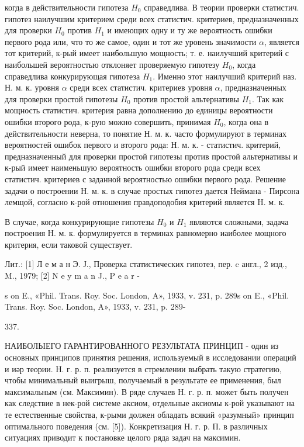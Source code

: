 \documentclass[10pt]{article}
\begin{document}
когда в действительности гипотеза $H_{0}$ справедлива. В теории проверки статистич. гипотез наилучшим критерием среди всех статистич. критериев, предназначенных для проверки $H_{0}$ против $H_{1}$ и имеющих одну и ту же вероятность ошибки первого рода или, что то же самое, один и тот же уровень значимости $\alpha$, является тот критерий, к-рый имеет наибольшую мощность; т. е. наилучший критерий с наибольшей вероятностью отклоняет проверяемую гипотезу $H_{0}$, когда справедлива конкурирующая гипотеза $H_{1}$. Именно этот наилучший критерий наз. Н. м. к. уровня $\alpha$ среди всех статистич. критериев уровня $\alpha$, предназначенных для проверки простой гипотезы $H_{0}$ против простой альтернативы $H_{1}$. Так как мощность статистич. критерия равна дополнению до единицы вероятности ошибки второго рода, к-рую можно совершить, принимая $H_{0}$, когда она в действительности неверна, то понятие Н. м. к. часто формулируют в терминах вероятностей ошибок первого и второго рода: Н. м. к. - статистич. критерий, предназначенный для проверки простой гипотезы против простой альтернативы и к-рый имеет наименьшую вероятность ошибки второго рода среди всех статистич. критериев с заданной вероятностью ошибки первого рода. Решение задачи о построении Н. м. к. в случае простых гипотез дается Неймана - Пирсона лемщой, согласно к-рой отношения правдоподобия критерий является H. м. к.



В случае, когда конкурирующие гипотезы $H_{0}$ и $H_{1}$ являются сложными, задача построения Н. м. к. формулируется в терминах равномерно иаиболее мощного критерия, если таковой существует.



Лит.: [1] Л е м а н Э. Ј., Проверка статистических гипотез, пер. c англ., 2 изд., M., 1979; [2] N e y m a n J., P e a r -

s on E., «Phil. Trans. Roy. Soc. London, A», 1933, v. 231, p. 289s on E., «Phil. Trans. Roy. Soc. London, A», 1933, v. 231, p. 289-

337.



НАИБОЛЬІЕГО ГАРАНТИРОВАННОГО РЕЗУЛЬТАТА ПРИНЦИП - один из основных принципов принятия решения, используемый в исследовании операций и иәр теории. Н. г. р. п. реализуется в стремлении выбрать такую стратегию, чтобы минимальный выигрыш, получаемый в результате ее применения, был максимальным (см. Максимин). В ряде случаев Н. г. р. п. может быть получен как следствие в нек-рой системе аксиом, отдельные аксиомы к-рой указывают на те естественные свойства, к-рыми должен обладать всякий «разумный» принцип оптимального поведения (см. [5]). Конкретизация Н. г. р. П. в различных ситуациях приводит к постановке целого ряда задач на максимин.
\end{document}
